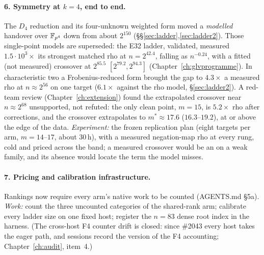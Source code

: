 \paragraph{6. Symmetry at $k=4$, end to end.} The $D_4$ reduction and its
four-unknown weighted form moved a \emph{modelled} handover over
$\mathbb{F}_{p^4}$ down from about $2^{150}$ (\S\S\ref{sec:ladder},\ref{sec:ladder2}).
Those single-point models are superseded: the E32 ladder, validated,
measured $1.5\cdot10^3\times$ its strongest matched rho at $n=2^{42.4}$,
falling as $n^{-0.24}$, with a fitted (not measured) crossover at
$2^{85.5}$ $[2^{79.2},2^{94.3}]$ (Chapter~\ref{ch:glvprogramme}). In
characteristic two a Frobenius-reduced form brought the gap to $4.3\times$
a measured rho at $n\approx2^{56}$ on one target ($6.1\times$ against the
rho model, \S\ref{sec:ladder2}). A red-team review
(Chapter~\ref{ch:extension}) found the extrapolated crossover near
$n\approx2^{68}$ unsupported, not refuted: the only clean point, $m=15$,
is $5.2\times$ rho after corrections, and the crossover extrapolates to
$m^*\approx17.6$ ($16.3$--$19.2$), at or above the edge of the data.
\emph{Experiment:} the frozen replication plan (eight targets per arm,
$m=14$--$17$, about 30\,h), with a measured negation-map rho at every
rung, cold and priced across the band; a measured crossover would be an
 on a weak family, and its absence would locate the term the
model misses.

\paragraph{7. Pricing and calibration infrastructure.} Rankings now
require every arm's native work to be counted (AGENTS.md \S5a).
\emph{Work:} count the three uncounted categories of the shared-rank arm;
calibrate every ladder size on one fixed host; register the $n=83$ dense
root index in the harness. (The cross-host F4 counter drift is closed:
since \#2043 every host takes the eager path, and sessions record the
version of the F4 accounting; Chapter~\ref{ch:audit}, item~4.)


